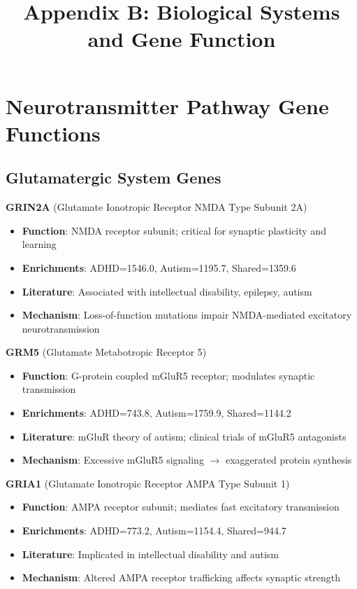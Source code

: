 \documentclass[12pt,letterpaper]{article}
\title{\textbf{Appendix B: Biological Systems and Gene Function}}
\author{}
\date{}
\begin{document}
\maketitle

\section{Neurotransmitter Pathway Gene Functions}

\subsection{Glutamatergic System Genes}

\textbf{GRIN2A} (Glutamate Ionotropic Receptor NMDA Type Subunit 2A)
\begin{itemize}
    \item \textbf{Function}: NMDA receptor subunit; critical for synaptic plasticity and learning
    \item \textbf{Enrichments}: ADHD=1546.0, Autism=1195.7, Shared=1359.6
    \item \textbf{Literature}: Associated with intellectual disability, epilepsy, autism
    \item \textbf{Mechanism}: Loss-of-function mutations impair NMDA-mediated excitatory neurotransmission
\end{itemize}

\textbf{GRM5} (Glutamate Metabotropic Receptor 5)
\begin{itemize}
    \item \textbf{Function}: G-protein coupled mGluR5 receptor; modulates synaptic transmission
    \item \textbf{Enrichments}: ADHD=743.8, Autism=1759.9, Shared=1144.2
    \item \textbf{Literature}: mGluR theory of autism; clinical trials of mGluR5 antagonists
    \item \textbf{Mechanism}: Excessive mGluR5 signaling $\rightarrow$ exaggerated protein synthesis
\end{itemize}

\textbf{GRIA1} (Glutamate Ionotropic Receptor AMPA Type Subunit 1)
\begin{itemize}
    \item \textbf{Function}: AMPA receptor subunit; mediates fast excitatory transmission
    \item \textbf{Enrichments}: ADHD=773.2, Autism=1154.4, Shared=944.7
    \item \textbf{Literature}: Implicated in intellectual disability and autism
    \item \textbf{Mechanism}: Altered AMPA receptor trafficking affects synaptic strength
\end{itemize}
\end{document}
